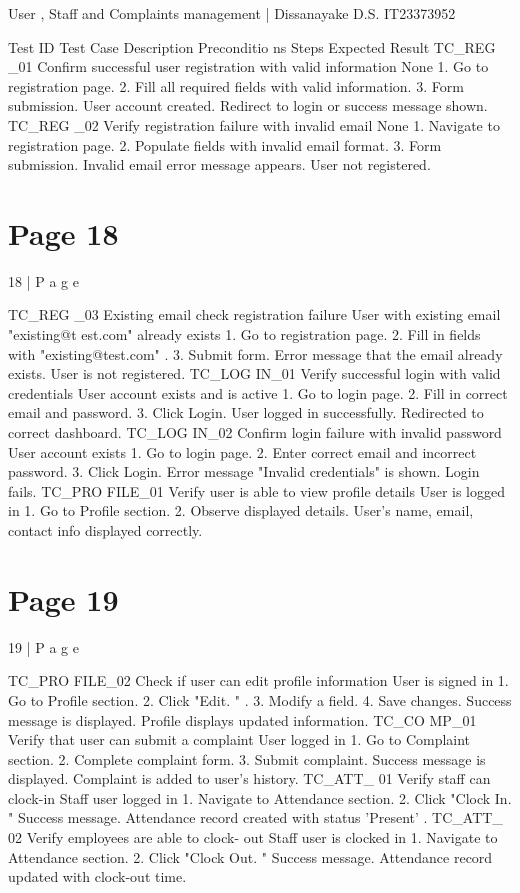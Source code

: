 \documentclass{article}
\begin{document}
User , Staff  and Complaints management | Dissanayake D.S. 
IT23373952 
 
Test ID Test Case 
Description 
Preconditio
ns 
Steps Expected 
Result 
TC\_REG
\_01 
Confirm 
successful user 
registration with 
valid 
information 
None 1. Go to registration page. 2. Fill all required 
fields with valid information. 3. Form 
submission. 
User account 
created. 
Redirect to 
login or 
success 
message 
shown. 
TC\_REG
\_02 
Verify 
registration 
failure with 
invalid email 
None 1. Navigate to registration page. 2. Populate 
fields with invalid email format. 3. Form 
submission. 
Invalid email 
error message 
appears. User 
not registered. 

\section*{Page 18}
18 | P a g e 
 
TC\_REG
\_03 
Existing email 
check 
registration 
failure 
User with 
existing 
email 
"existing@t
est.com" 
already 
exists 
1. Go to registration page. 2. Fill in fields with 
"existing@test.com" . 3. Submit form. 
Error message 
that the email 
already exists. 
User is not 
registered. 
TC\_LOG
IN\_01 
Verify 
successful login 
with valid 
credentials 
User 
account 
exists and 
is active 
1. Go to login page. 2. Fill in correct email 
and password. 3. Click Login. 
User logged in 
successfully. 
Redirected to 
correct 
dashboard. 
TC\_LOG
IN\_02 
Confirm login 
failure with 
invalid 
password 
User 
account 
exists 
1. Go to login page. 2. Enter correct email 
and incorrect password. 3. Click Login. 
Error message 
"Invalid 
credentials" is 
shown. Login 
fails. 
TC\_PRO
FILE\_01 
Verify user is 
able to view 
profile details 
User is 
logged in 
1. Go to Profile section. 2. Observe displayed 
details. 
User's name, 
email, 
contact info 
displayed 
correctly. 

\section*{Page 19}
19 | P a g e 
 
TC\_PRO
FILE\_02 
Check if user 
can edit profile 
information 
User is 
signed in 
1. Go to Profile section. 2. Click "Edit. " . 3. 
Modify a field. 4. Save changes. 
Success 
message is 
displayed. 
Profile 
displays 
updated 
information. 
TC\_CO
MP\_01 
Verify that user 
can submit a 
complaint 
User logged 
in 
1. Go to Complaint section. 2. Complete 
complaint form. 3. Submit complaint. 
Success 
message is 
displayed. 
Complaint is 
added to 
user's history. 
TC\_ATT\_
01 
Verify staff can 
clock-in 
Staff user 
logged in 
1. Navigate to Attendance section. 2. Click 
"Clock In. " 
Success 
message. 
Attendance 
record 
created with 
status 
'Present' . 
TC\_ATT\_
02 
Verify 
employees are 
able to clock-
out 
Staff user is 
clocked in 
1. Navigate to Attendance section. 2. Click 
"Clock Out. " 
Success 
message. 
Attendance 
record 
updated with 
clock-out 
time. 
\end{document}
